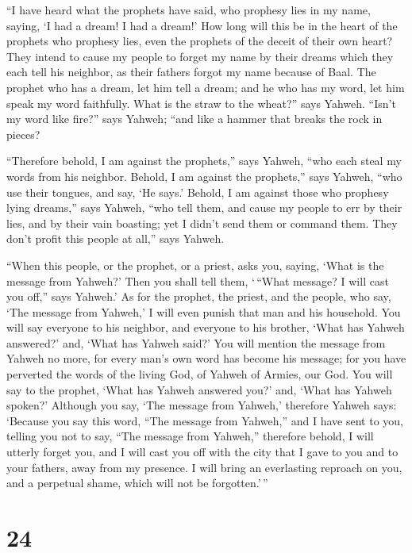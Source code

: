  ``I have heard what the prophets have said, who prophesy
lies in my name, saying, `I had a dream! I had a dream!' 
How long will this be in the heart of the prophets who prophesy lies,
even the prophets of the deceit of their own heart?  They
intend to cause my people to forget my name by their dreams which they
each tell his neighbor, as their fathers forgot my name because of Baal.
 The prophet who has a dream, let him tell a dream; and he
who has my word, let him speak my word faithfully. What is the straw to
the wheat?'' says Yahweh.  ``Isn't my word like fire?''
says Yahweh; ``and like a hammer that breaks the rock in pieces?

 ``Therefore behold, I am against the prophets,'' says
Yahweh, ``who each steal my words from his neighbor. 
Behold, I am against the prophets,'' says Yahweh, ``who use their
tongues, and say, `He says.'  Behold, I am against those
who prophesy lying dreams,'' says Yahweh, ``who tell them, and cause my
people to err by their lies, and by their vain boasting; yet I didn't
send them or command them. They don't profit this people at all,'' says
Yahweh.

 ``When this people, or the prophet, or a priest, asks you,
saying, `What is the message from Yahweh?' Then you shall tell them,
`\,``What message? I will cast you off,'' says Yahweh.'  As
for the prophet, the priest, and the people, who say, `The message from
Yahweh,' I will even punish that man and his household. 
You will say everyone to his neighbor, and everyone to his brother,
`What has Yahweh answered?' and, `What has Yahweh said?' 
You will mention the message from Yahweh no more, for every man's own
word has become his message; for you have perverted the words of the
living God, of Yahweh of Armies, our God.  You will say to
the prophet, `What has Yahweh answered you?' and, `What has Yahweh
spoken?'  Although you say, `The message from Yahweh,'
therefore Yahweh says: `Because you say this word, ``The message from
Yahweh,'' and I have sent to you, telling you not to say, ``The message
from Yahweh,''  therefore behold, I will utterly forget
you, and I will cast you off with the city that I gave to you and to
your fathers, away from my presence.  I will bring an
everlasting reproach on you, and a perpetual shame, which will not be
forgotten.'\,''

\hypertarget{section-23}{%
\section{24}\label{section-23}}

